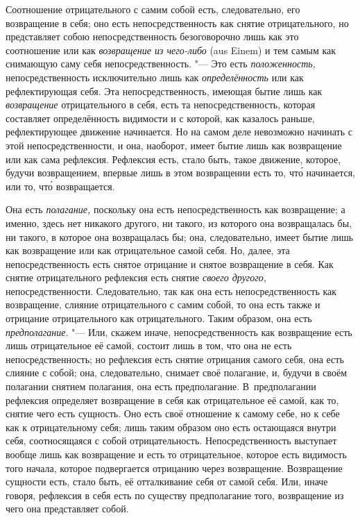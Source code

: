 Соотношение отрицательного с самим собой есть, следовательно, его
возвращение в себя; оно есть непосредственность как снятие отрицательного,
но представляет собою непосредственность безоговорочно лишь как это
соотношение или как {\em возвращение из чего-либо} (aus
Einem) и тем самым как снимающую саму себя непосредственность. "--- Это есть
{\em положенность,} непосредственность исключительно
лишь как {\em определённость} или как рефлектирующая
себя. Эта непосредственность, имеющая бытие лишь как
{\em возвращение} отрицательного в себя, есть та
непосредственность, которая составляет определённость видимости и с
которой, как казалось раньше, рефлектирующее движение начинается. Но на
самом деле невозможно начинать с этой непосредственности, и она, наоборот,
имеет бытие лишь как возвращение или как сама рефлексия. Рефлексия есть,
стало быть, такое движение, которое, будучи возвращением, впервые лишь в
этом возвращении есть то, чт\'{о} начинается, или то, чт\'{о} возвращается.

Она есть {\em полагание,} поскольку она есть
непосредственность как возвращение; а именно, здесь нет никакого другого,
ни такого, из которого она возвращалась бы, ни такого, в которое она
возвращалась бы; она, следовательно, имеет бытие лишь как возвращение или
как отрицательное самой себя. Но, далее, эта непосредственность есть снятое
отрицание и снятое возвращение в себя. Как снятие отрицательного рефлексия
есть снятие {\em своего другого,} непосредственности.
Следовательно, так как она есть непосредственность как возвращение, слияние
отрицательного с самим собой, то она есть также и отрицание отрицательного
как отрицательного. Таким образом, она есть
{\em предполагание}. "--- Или, скажем иначе,
непосредственность как возвращение есть лишь отрицательное её самой,
состоит лишь в том, что она не есть непосредственность; но рефлексия есть
снятие отрицания самого себя, она есть слияние с собой; она, следовательно,
снимает своё полагание, и, будучи в своём полагании снятием полагания, она
есть предполагание. В~предполагании рефлексия определяет возвращение в себя
как отрицательное её самой, как то, снятие чего есть сущность. Оно есть
своё отношение к самому себе, но к себе как к отрицательному себя; лишь
таким образом оно есть остающаяся внутри себя, соотносящаяся с собой
отрицательность. Непосредственность выступает вообще лишь как возвращение и
есть то отрицательное, которое есть видимость того начала, которое
подвергается отрицанию через возвращение. Возвращение сущности есть, стало
быть, её отталкивание себя от самой себя. Или, иначе говоря, рефлексия в
себя есть по существу предполагание того, возвращение из чего она
представляет собой.

